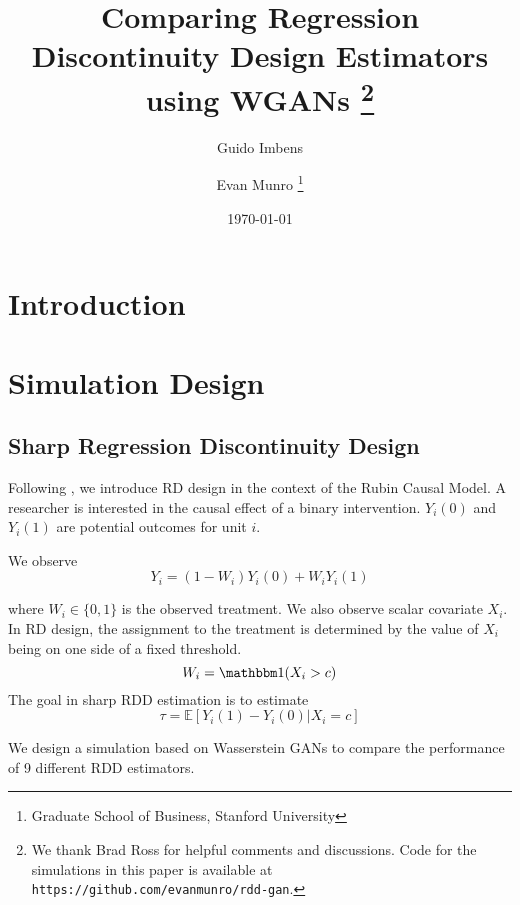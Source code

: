\documentclass[12pt]{article}
\theoremstyle{definition}
\begin{document}
\title{Comparing Regression Discontinuity Design Estimators using WGANs  \thanks{
We thank Brad Ross for helpful comments and discussions. Code for the simulations in this paper is available at \texttt{https://github.com/evanmunro/rdd-gan}.}}

\author{ Guido Imbens
\and 
Evan Munro 
\thanks{Graduate School of Business, Stanford University }  } 

\date{ 
\today } 
\maketitle
\singlespacing 
{} 


\newpage 
\onehalfspacing
\section{Introduction} 

\section{Simulation Design}

\subsection{Sharp Regression Discontinuity Design} 

Following \citet{imbens2008regression}, we introduce RD design in the context of the Rubin Causal Model. A researcher is interested in the causal effect of a binary intervention. $Y_i(0)$ and $Y_i(1)$ are potential outcomes for unit $i$. 

We observe
\[ Y_i = (1-W_i) Y_i(0) + W_i Y_i(1)\] 

where $W_i \in \{0, 1\}$ is the observed treatment. We also observe scalar covariate $X_i$. In RD design, the assignment to the treatment is determined by the value of $X_i$ being on one side of a fixed threshold. 
\[ W_i = \mathbbm 1 (X_i > c )\] 
The goal in sharp RDD estimation is to estimate 
\[ \tau = \mathbb E[ Y_i(1) - Y_i(0) | X_i = c] \] 

We design a simulation based on Wasserstein GANs to compare the performance of 9 different RDD estimators. 
\end{document}
